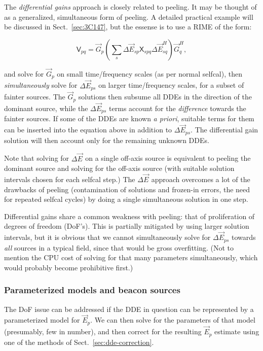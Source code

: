 \documentclass[]{aa}
\newcommand{\herm}{H}
\newcommand{\jones}[2]{\vec {#1}_{#2}}
\newcommand{\jonesT}[2]{\vec {#1}^{\herm}_{#2}}
\newcommand{\coh}[2]{\mathsf{{#1}}_{{#2}}}
\begin{document}
The \emph{differential gains} approach is closely related to peeling. It may be thought of as a generalized, simultaneous form of peeling. A detailed practical example will be discussed in Sect.~\ref{sec:3C147}, but the essense is to use a RIME of the form:

\[
\coh{V}{pq} = \jones{G}{p} \left( \sum_s \Delta\jones{E}{sp} \coh{X}{spq} \Delta\jonesT{E}{sq} \right)  \jonesT{G}{q},
\]

and solve for $\jones{G}{p}$ on small time/frequency scales (as per normal selfcal), then \emph{simultaneously} solve for $\Delta\jones{E}{ps}$ on larger time/frequency scales, for a subset of fainter sources. The $\jones{G}{p}$ solutions then subsume all DDEs in the direction of the dominant source, while the $\Delta\jones{E}{ps}$ terms account for the \emph{difference} towards the fainter sources. If some of the DDEs are known \emph{a priori}, suitable terms for them can be inserted into the equation above in addition to $\Delta\jones{E}{ps}$. The differential gain solution will then account only for the remaining unknown DDEs.

Note that solving for $\Delta\jones{E}{}$ on a single off-axis source is equivalent to peeling the dominant source and solving for the off-axis source (with suitable solution intervals chosen for each selfcal step.) The $\Delta\jones{E}{}$ approach overcomes a lot of the drawbacks of peeling (contamination of solutions and frozen-in errors, the need for repeated selfcal cycles) by doing a single simultaneous solution in one step.

Differential gains share a common weakness with peeling: that of proliferation of degrees of freedom (DoF's). This is partially mitigated by using larger solution intervals, but it is obvious that we cannot simultaneously solve for $\Delta\jones{E}{ps}$ towards \emph{all} sources in a typical field, since that would be gross overfitting. (Not to mention the CPU cost of solving for that many parameters simultaneously, which would probably become prohibitive first.) 

\subsubsection{Parameterized models and beacon sources}

The DoF issue can be addressed if the DDE in question can be represented by a parameterized model for $\jones{E}{p}$. We can then solve for the parameters of that model (presumably, few in number), and then correct for the resulting $\jones{E}{p}$ estimate using one of the methods of Sect.~\ref{sec:dde-correction}. 
\end{document}
